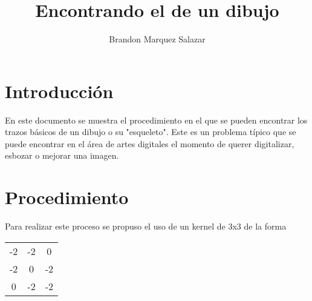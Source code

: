 \documentclass[10pt]{IEEEtran}
\title{Encontrando el \say{esqueleto} de un dibujo}
\author{ Brandon Marquez Salazar }
\begin{document}
  \maketitle
  \section{Introducción}
  En este documento se muestra el procedimiento en el que se pueden encontrar los trazos básicos de un dibujo o su "esqueleto". Este es un problema típico que se puede encontrar en el área de artes digitales
  el momento de querer digitalizar, esbozar o mejorar una imagen.

  \section{Procedimiento}
  Para realizar este proceso se propuso el uso de un kernel de 3x3 de la forma
  \begin{tabular}{ c c c }
    -2 & -2 &  0\\
    -2 &  0 & -2\\
     0 & -2 & -2
  \end{tabular}
  
\end{document}
